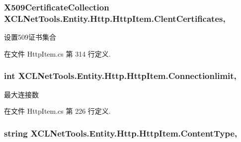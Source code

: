 \subsubsection[{\texorpdfstring{Clent\+Certificates}{ClentCertificates}}]{\setlength{\rightskip}{0pt plus 5cm}X509\+Certificate\+Collection X\+C\+L\+Net\+Tools.\+Entity.\+Http.\+Http\+Item.\+Clent\+Certificates\hspace{0.3cm}{\ttfamily [get]}, {\ttfamily [set]}}\hypertarget{class_x_c_l_net_tools_1_1_entity_1_1_http_1_1_http_item_a7f2e0b57b041174af1325324fe7e0f0d}{}\label{class_x_c_l_net_tools_1_1_entity_1_1_http_1_1_http_item_a7f2e0b57b041174af1325324fe7e0f0d}


设置509证书集合 



在文件 Http\+Item.\+cs 第 314 行定义.

\subsubsection[{\texorpdfstring{Connectionlimit}{Connectionlimit}}]{\setlength{\rightskip}{0pt plus 5cm}int X\+C\+L\+Net\+Tools.\+Entity.\+Http.\+Http\+Item.\+Connectionlimit\hspace{0.3cm}{\ttfamily [get]}, {\ttfamily [set]}}\hypertarget{class_x_c_l_net_tools_1_1_entity_1_1_http_1_1_http_item_af0502f773d88639113d1f71698039b0a}{}\label{class_x_c_l_net_tools_1_1_entity_1_1_http_1_1_http_item_af0502f773d88639113d1f71698039b0a}


最大连接数 



在文件 Http\+Item.\+cs 第 226 行定义.

\subsubsection[{\texorpdfstring{Content\+Type}{ContentType}}]{\setlength{\rightskip}{0pt plus 5cm}string X\+C\+L\+Net\+Tools.\+Entity.\+Http.\+Http\+Item.\+Content\+Type\hspace{0.3cm}{\ttfamily [get]}, {\ttfamily [set]}}\hypertarget{class_x_c_l_net_tools_1_1_entity_1_1_http_1_1_http_item_af97df28ba0445d64b38abd7c3bb1a6be}{}\label{class_x_c_l_net_tools_1_1_entity_1_1_http_1_1_http_item_af97df28ba0445d64b38abd7c3bb1a6be}


